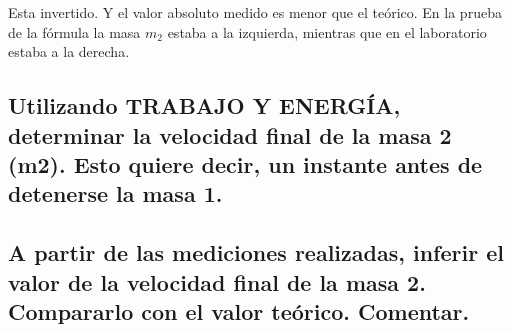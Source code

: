 \documentclass[12pt]{article}
\begin{document}
Esta invertido.
Y el valor absoluto medido es menor que el teórico.
En la prueba de la fórmula la masa $m_2$ estaba a la izquierda, mientras que en el laboratorio estaba a la derecha.

\subsection{Utilizando  TRABAJO  Y  ENERGÍA,
determinar  la  velocidad  final  de  la  masa  2 (m2).
Esto quiere decir, un instante antes de detenerse la masa 1.}%

\subsection{A partir de las mediciones realizadas,
inferir el valor de la velocidad final de la masa 2.
Compararlo con el valor teórico.
Comentar.}%
\end{document}
